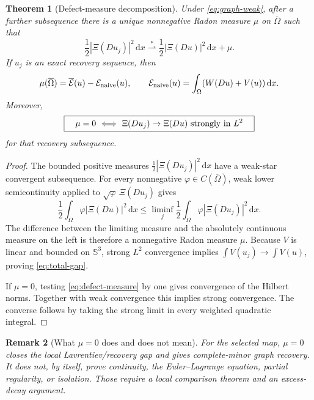 \documentclass[11pt]{article}
\newtheorem{theorem}{Theorem}[section]
\newtheorem{remark}[theorem]{Remark}
\newcommand{\dd}{\,\mathrm d}
\newcommand{\SSS}{\mathbb S}
\newcommand{\cE}{\mathcal E}
\begin{document}
\begin{theorem}[Defect-measure decomposition]
Under \eqref{eq:graph-weak}, after a further subsequence there is a unique
nonnegative Radon measure $\mu$ on $\overline\Omega$ such that
\begin{equation}
 \boxed{\quad
 \frac12|\Xi(Du_j)|^2\dd x
 \stackrel{*}{\rightharpoonup}
 \frac12|\Xi(Du)|^2\dd x+\mu.\quad}
 \label{eq:defect-measure}
\end{equation}
If $u_j$ is an exact recovery sequence, then
\begin{equation}
 \mu(\overline\Omega)
 =\overline{\cE}(u)-\cE_{\rm naive}(u),\qquad
 \cE_{\rm naive}(u)=\int_\Omega(W(Du)+V(u))\dd x.
 \label{eq:total-gap}
\end{equation}
Moreover,
\begin{equation}
 \boxed{\quad
 \mu=0\ \Longleftrightarrow\
 \Xi(Du_j)\to\Xi(Du)\ \hbox{strongly in }L^2
 \quad}
 \label{eq:zero-iff-strong}
\end{equation}
for that recovery subsequence.
\end{theorem}

\begin{proof}
The bounded positive measures
$\frac12|\Xi(Du_j)|^2\dd x$ have a weak-star convergent subsequence.  For
every nonnegative $\varphi\in C(\overline\Omega)$, weak lower
semicontinuity applied to $\sqrt\varphi\,\Xi(Du_j)$ gives
\[
 \frac12\int_\Omega\varphi|\Xi(Du)|^2\dd x
 \leq\liminf_j\frac12\int_\Omega\varphi|\Xi(Du_j)|^2\dd x.
\]
The difference between the limiting measure and the absolutely continuous
measure on the left is therefore a nonnegative Radon measure $\mu$.
Because $V$ is linear and bounded on $\SSS^3$, strong $L^2$ convergence
implies $\int V(u_j)\to\int V(u)$, proving \eqref{eq:total-gap}.

If $\mu=0$, testing \eqref{eq:defect-measure} by one gives convergence of
the Hilbert norms.  Together with weak convergence this implies strong
convergence.  The converse follows by taking the strong limit in every
weighted quadratic integral.
\end{proof}

\begin{remark}[What $\mu=0$ does and does not mean]
For the selected map, $\mu=0$ closes the local Lavrentiev/recovery gap and
gives complete-minor graph recovery.  It does not, by itself, prove
continuity, the Euler--Lagrange equation, partial regularity, or isolation.
Those require a local comparison theorem and an excess-decay argument.
\end{remark}
\end{document}
